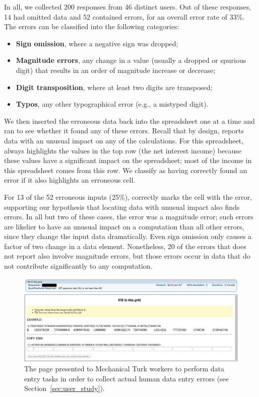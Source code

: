 In all, we collected 200 responses from 46 distinct users. Out of
these responses, 14 had omitted data and 52 contained errors, for an
overall error rate of 33\%. The errors can be classified into the following categories:

\begin{itemize}
\item \textbf{Sign omission}, where a negative sign was dropped;
\item \textbf{Magnitude errors}, any change in a value (usually a dropped or spurious digit) that results in an order of magnitude increase or decrease;
\item \textbf{Digit transposition}, where at least two digits are transposed;
\item \textbf{Typos}, any other typographical error (e.g., a mistyped digit).
\end{itemize}

We then inserted the erroneous data back into the spreadsheet one at a
time and ran \checkcell{} to see whether it found any of these
errors. Recall that by design, \checkcell{} reports data with an
unusual impact on any of the calculations. For this
spreadsheet, \checkcell{} always highlights the values in the top row
(the net interest income) because these values have a significant
impact on the spreadsheet; most of the income in this spreadsheet
comes from this row. We classify \checkcell{} as having correctly
found an error if it also highlights an erroneous cell.

For 13 of the 52 erroneous inputs (25\%), \checkcell{} correctly marks
the cell with the error, supporting our hypothesis that locating data
with unusual impact also finds errors. In all but two of these cases,
the error was a magnitude error; such errors are likelier to have an
unusual impact on a computation than all other errors, since they
change the input data dramatically. Even sign omission only causes a
factor of two change in a data element. Nonetheless, 20 of the errors
that \checkcell{} does not report also involve magnitude errors, but
those errors occur in data that do not contribute significantly to any
computation.


\begin{figure}[!t]
\centering
\includegraphics[width=5.5in]{images/mturk_fuzz_task}
  \caption{The page presented to Mechanical Turk workers to perform data entry tasks in order to collect actual human data entry errors (see Section~\ref{sec:user_study}).\label{fig:mturk_task}}
\end{figure}


